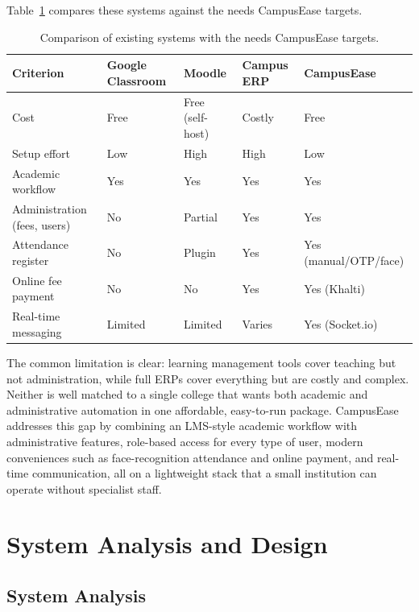 \documentclass[12pt,a4paper]{report}
\begin{document}
Table~\ref{tab:comparison} compares these systems against the needs CampusEase targets.

\begin{table}[H]
\centering
\caption{Comparison of existing systems with the needs CampusEase targets.}
\label{tab:comparison}
\small
\begin{tabular}{|p{2.8cm}|p{2.3cm}|p{2.1cm}|p{2.3cm}|p{2.3cm}|}
\hline
\textbf{Criterion} & \textbf{Google Classroom} & \textbf{Moodle} & \textbf{Campus ERP} & \textbf{CampusEase} \\
\hline
Cost & Free & Free (self-host) & Costly & Free \\
\hline
Setup effort & Low & High & High & Low \\
\hline
Academic workflow & Yes & Yes & Yes & Yes \\
\hline
Administration (fees, users) & No & Partial & Yes & Yes \\
\hline
Attendance register & No & Plugin & Yes & Yes (manual/OTP/face) \\
\hline
Online fee payment & No & No & Yes & Yes (Khalti) \\
\hline
Real-time messaging & Limited & Limited & Varies & Yes (Socket.io) \\
\hline
\end{tabular}
\end{table}

The common limitation is clear: learning management tools cover teaching but not administration, while full ERPs cover everything but are costly and complex. Neither is well matched to a single college that wants both academic and administrative automation in one affordable, easy-to-run package. CampusEase addresses this gap by combining an LMS-style academic workflow with administrative features, role-based access for every type of user, modern conveniences such as face-recognition attendance and online payment, and real-time communication, all on a lightweight stack that a small institution can operate without specialist staff.

\chapter{System Analysis and Design}

\section{System Analysis}
\end{document}
